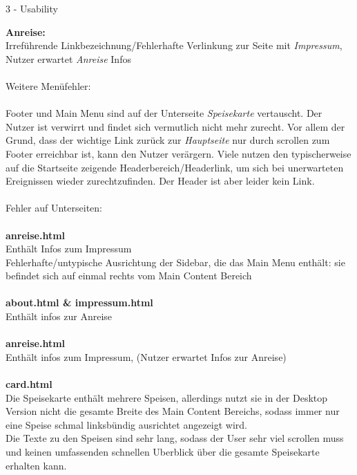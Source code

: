 \documentclass[a4paper]{article}
\begin{document}
\begin{exercise}{3 - Usability}
\begin{itemize}
\textbf{Anreise:}\\
Irreführende Linkbezeichnung/Fehlerhafte Verlinkung zur Seite mit \textit{Impressum}, Nutzer erwartet \textit{Anreise} Infos\\\\
{\Large Weitere Menüfehler:}\\\\
Footer und Main Menu sind auf der Unterseite \textit{Speisekarte} vertauscht. Der Nutzer ist verwirrt und findet sich vermutlich nicht mehr zurecht.
Vor allem der Grund, dass der wichtige Link zurück zur \textit{Hauptseite} nur durch scrollen zum Footer erreichbar ist, kann den Nutzer verärgern. Viele nutzen den typischerweise auf die Startseite zeigende Headerbereich/Headerlink, um sich bei unerwarteten Ereignissen wieder zurechtzufinden. Der Header ist aber leider kein Link.\\\\
{\Large Fehler auf Unterseiten:}\\\\
\textbf{anreise.html}\\
Enthält Infos zum Impressum\\
Fehlerhafte/untypische Ausrichtung der Sidebar, die das Main Menu enthält: sie befindet sich auf einmal rechts vom Main Content Bereich\\\\
\textbf{about.html \& impressum.html}\\
Enthält infos zur Anreise\\\\
\textbf{anreise.html }\\
Enthält infos zum Impressum, (Nutzer erwartet Infos zur Anreise)\\\\
\textbf{card.html}\\
Die Speisekarte enthält mehrere Speisen, allerdings nutzt sie in der Desktop Version nicht die gesamte Breite des Main Content Bereichs, sodass immer nur eine Speise schmal linksbündig ausrichtet angezeigt wird.\\
Die Texte zu den Speisen sind sehr lang, sodass der User sehr viel scrollen muss und keinen umfassenden schnellen Uberblick über die gesamte Speisekarte erhalten kann.



\end{itemize}
\end{exercise}
\end{document}
